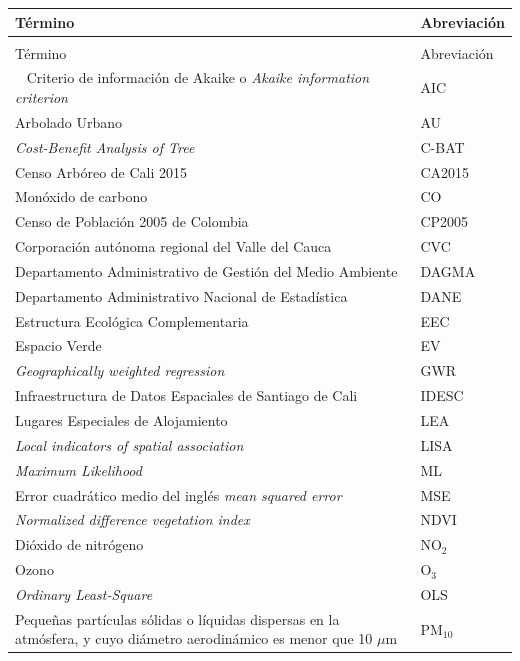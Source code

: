 \documentclass[12pt,a4paper,oneside, openany]{book}
\theoremstyle{definition}
\theoremstyle{definition}
\theoremstyle{definition}
\theoremstyle{remark}
\begin{document}
\begin{longtable}{>{\raggedright\arraybackslash}p{10cm}l}
\toprule
Término & Abreviación\\
\midrule
\endfirsthead
\multicolumn{2}{@{}l}{\textit{(continúa)}}\\
\toprule
Término & Abreviación\\
\midrule
\endhead
\
\endfoot
\bottomrule
\endlastfoot
\rowcolor{gray!6}  Criterio de información de Akaike o \textit{Akaike information criterion} & AIC\\
Arbolado Urbano & AU\\
\rowcolor{gray!6}  \textit{Cost-Benefit Analysis of Tree} & C-BAT\\
Censo Arbóreo de Cali 2015 & CA2015\\
\rowcolor{gray!6}  Monóxido de carbono & CO\\
\addlinespace
Censo de Población 2005 de Colombia & CP2005\\
\rowcolor{gray!6}  Corporación autónoma regional del Valle del Cauca & CVC\\
Departamento Administrativo de Gestión del Medio Ambiente & DAGMA\\
\rowcolor{gray!6}  Departamento Administrativo Nacional de Estadística & DANE\\
Estructura Ecológica Complementaria & EEC\\
\addlinespace
\rowcolor{gray!6}  Espacio Verde & EV\\
\textit{Geographically weighted regression} & GWR\\
\rowcolor{gray!6}  Infraestructura de Datos Espaciales de Santiago de Cali & IDESC\\
Lugares Especiales de Alojamiento & LEA\\
\rowcolor{gray!6}  \textit{Local indicators of spatial association} & LISA\\
\addlinespace
\textit{Maximum Likelihood} & ML\\
\rowcolor{gray!6}  Error cuadrático medio del inglés \textit{mean squared error} & MSE\\
\textit{Normalized difference vegetation index} & NDVI\\
\rowcolor{gray!6}  Dióxido de nitrógeno & NO$_2$\\
Ozono & O$_3$\\
\addlinespace
\rowcolor{gray!6}  \textit{Ordinary Least-Square} & OLS\\
Pequeñas partículas sólidas o líquidas dispersas en la atmósfera, y cuyo diámetro aerodinámico es menor que 10 $\mu$m & PM$_{10}$\\

\end{longtable}
\end{document}
